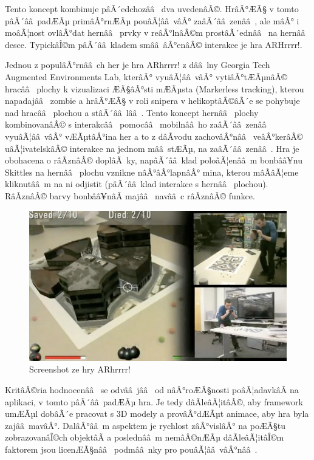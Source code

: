 \documentclass[twoside,12pt]{article}
\begin{document}
Tento koncept kombinuje pâÃ´edchozââ  dva uvedenâÂ©. HrâÂ°ÆÃ§ v tomto pâÃ´ââ padÆÃµ primâÂ°rnÆÃµ pouâÃ¦ââ vâÂ° zaâÃ´ââ zenââ , ale mâÂ° i moâÃ¦nost ovlâÂ°dat hernââ  prvky v reâÂ°lnâÂ©m prostâÃ´ednââ  na hernââ  desce. TypickâÎ©m pâÃ´ââ kladem smââ âÂ°enâÂ© interakce je hra ARHrrrr!.

% 
Jednou z populâÂ°rnââ ch her je hra ARhrrrr! z dââ lny Georgia Tech Augmented Environments Lab, kterâÂ° vyuâÃ¦ââ vâÂ° vytiâÂ°tÆÃµnâÂ© hracââ  plochy k vizualizaci ÆÃ§âÂ°sti mÆÃµsta (Markerless tracking), kterou napadajââ  zombie a hrâÂ°ÆÃ§ v roli snipera v helikoptâÂ©âÃ´e se pohybuje nad hracââ  plochou a stâÃ´ââ lââ . Tento koncept hernââ  plochy kombinovanâÂ© s interakcââ  pomocââ  mobilnââ ho zaâÃ´ââ zenââ  vyuâÃ¦ââ vâÂ° vÆÃµtâÂ°ina her a to z dâÃvodu zachovâÂ°nââ  veâÂ°kerâÂ© uâÃ¦ivatelskâÂ© interakce na jednom mââ stÆÃµ, na zaâÃ´ââ zenââ . Hra je obohacena o râÃznâÂ© doplâÃ ky, napâÃ´ââ klad poloâÃ¦enââ m bonbââ¥nu Skittles na hernââ  plochu vznikne nâÂ°âÂ°lapnâÂ° mina, kterou mâÃâÃ¦eme kliknutââ m na ni odjistit (pâÃ´ââ klad interakce s hernââ  plochou). RâÃznâÂ© barvy bonbââ¥nâÃ majââ  navââ c râÃznâÂ© funkce.

\begin{figure}[H]
    \includegraphics[width=424px, center]{images/arhrrrr.jpg}
    \caption{Screenshot ze hry ARhrrrr!}
    \label{arhrrrr_screenshot}
\end{figure}


% 
\newpage 


KritâÂ©ria hodnocenââ  se odvââ jââ  od nâÂ°roÆÃ§nosti poâÃ¦adavkâÃ na aplikaci, v tomto pâÃ´ââ padÆÃµ hra. Je tedy dâÃleâÃ¦itâÂ©, aby framework umÆÃµl dobâÃ´e pracovat s 3D modely a provâÂ°dÆÃµt animace, aby hra byla zajââ mavâÂ°. DalâÂ°ââ m aspektem je rychlost zâÂ°vislâÂ° na poÆÃ§tu zobrazovanâÎ©ch objektâÃ a poslednââ m nemâÂ©nÆÃµ dâÃleâÃ¦itâÎ©m faktorem jsou licenÆÃ§nââ  podmââ nky pro pouâÃ¦ââ vâÂ°nââ .
\end{document}
